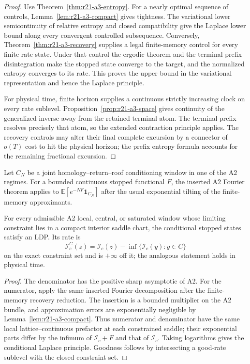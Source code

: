 \begin{proof}
Use Theorem~\ref{thm:r21-a3-entropy}.  For a nearly optimal sequence of
controls, Lemma~\ref{lem:r21-a3-compact} gives tightness.  The variational
lower semicontinuity of relative entropy and closed compatibility give the
Laplace lower bound along every convergent controlled subsequence.  Conversely,
Theorem~\ref{thm:r21-a3-recovery} supplies a legal finite-memory control for
every finite-rate state.  Under that control the ergodic theorem and the
terminal-prefix disintegration make the stopped state converge to the target,
and the normalized entropy converges to its rate.  This proves the upper
bound in the variational representation and hence the Laplace principle.

For physical time, finite horizon supplies a continuous strictly increasing
clock on every rate sublevel.  Proposition~\ref{prop:r21-a3-space} gives
continuity of the generalized inverse away from the retained terminal atom.
The terminal prefix resolves precisely that atom, so the extended contraction
principle applies.  The recovery controls may alter their final complete
excursion by a connector of $o(T)$ cost to hit the physical horizon; the
prefix entropy formula accounts for the remaining fractional excursion.
\end{proof}

Let $C_N$ be a joint homology--return--roof conditioning window in one of the
A2 regimes.  For a bounded continuous stopped functional $F$, the inserted A2
Fourier theorem applies to
$\mathbb E[e^{-NF}\mathbf1_{C_N}]$ after the usual exponential tilting of the
finite-memory approximants.

\begin{theorem}
\label{thm:r21-a3-conditional}
For every admissible A2 local, central, or saturated window whose limiting
constraint lies in a compact interior saddle chart, the conditional stopped
states satisfy an LDP.  Its rate is
\[
 \mathcal I_c^C(z)=
 \mathcal I_c(z)-\inf\{\mathcal I_c(y):y\in C\}
\]
on the exact constraint set and is $+\infty$ off it; the analogous statement
holds in physical time.
\end{theorem}

\begin{proof}
The denominator has the positive sharp asymptotic of A2.  For the numerator,
apply the same inserted Fourier decomposition after the finite-memory
recovery reduction.  The insertion is a bounded multiplier on the A2 bundle,
and approximation errors are exponentially negligible by
Lemma~\ref{lem:r21-a3-compact}.  Thus numerator and denominator have the same
local lattice--continuous prefactor at each constrained saddle; their
exponential parts differ by the infimum of $\mathcal I_c+F$ and that of
$\mathcal I_c$.  Taking logarithms gives the conditional Laplace principle.
Goodness follows by intersecting a good-rate sublevel with the closed
constraint set.
\end{proof}

